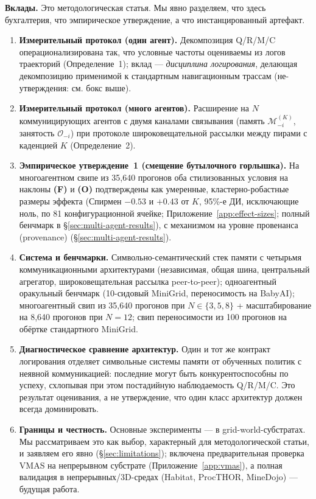 \documentclass{article}
\begin{document}
\textbf{Вклады.} Это методологическая статья. Мы явно разделяем, что здесь бухгалтерия, что эмпирическое утверждение, а что инстанцированный артефакт.
\begin{enumerate}[leftmargin=20pt,itemsep=2pt,topsep=2pt]
\item \textbf{Измерительный протокол (один агент).} Декомпозиция Q/R/M/C операционализирована так, что условные частоты оцениваемы из логов траекторий (Определение~1); вклад --- \emph{дисциплина логирования}, делающая декомпозицию применимой к стандартным навигационным трассам (не-утверждения: см. бокс выше).

\item \textbf{Измерительный протокол (много агентов).} Расширение на $N$ коммуницирующих агентов с двумя каналами связывания (память $\mathcal{M}_{-i}^{(K)}$, занятость $\mathcal{O}_{-i}$) при протоколе широковещательной рассылки между пирами с каденцией $K$ (Определение~2).

\item \textbf{Эмпирическое утверждение~1 (смещение бутылочного горлышка).} На многоагентном свипе из 35{,}640 прогонов оба стилизованных условия на наклоны \textbf{(F)} и \textbf{(O)} подтверждены как умеренные, кластерно-робастные размеры эффекта (Спирмен $-0.53$ и $+0.43$ от $K$, 95\%-е ДИ, исключающие ноль, по 81 конфигурационной ячейке; Приложение~\ref{app:effect-sizes}; полный бенчмарк в \S\ref{sec:multi-agent-results}), с механизмом на уровне провенанса (provenance) (\S\ref{sec:multi-agent-results}).

\item \textbf{Система и бенчмарки.} Символьно-семантический стек памяти с четырьмя коммуникационными архитектурами (независимая, общая шина, центральный агрегатор, широковещательная рассылка peer-to-peer); одноагентный оракульный бенчмарк (10-сидовый MiniGrid, переносимость на BabyAI); многоагентный свип из 35{,}640 прогонов при $N\!\in\!\{3,5,8\}$ + масштабирование на 8{,}640 прогонов при $N\!=\!12$; свип переносимости из 100 прогонов на обёртке стандартного MiniGrid.

\item \textbf{Диагностическое сравнение архитектур.} Один и тот же контракт логирования отделяет символьные системы памяти от обученных политик с неявной коммуникацией: последние могут быть конкурентоспособны по успеху, схлопывая при этом постадийную наблюдаемость Q/R/M/C. Это результат оценивания, а не утверждение, что один класс архитектур должен всегда доминировать.

\item \textbf{Границы и честность.} Основные эксперименты --- в grid-world-субстратах. Мы рассматриваем это как выбор, характерный для методологической статьи, и заявляем его явно (\S\ref{sec:limitations}); включена предварительная проверка VMAS на непрерывном субстрате (Приложение~\ref{app:vmas}), а полная валидация в непрерывных/3D-средах (Habitat, ProcTHOR, MineDojo) --- будущая работа.
\end{enumerate}
\end{document}

